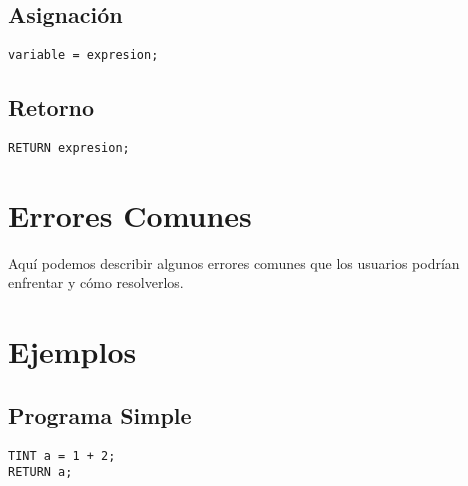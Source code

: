 \documentclass[12pt]{article}
\begin{document}
\subsection{Asignación}
\begin{lstlisting}
variable = expresion;
\end{lstlisting}

\subsection{Retorno}
\begin{lstlisting}
RETURN expresion;
\end{lstlisting}

\section{Errores Comunes}
Aquí podemos describir algunos errores comunes que los usuarios podrían enfrentar y cómo resolverlos.

\section{Ejemplos}
\subsection{Programa Simple}
\begin{lstlisting}
TINT a = 1 + 2;
RETURN a;
\end{lstlisting}
\end{document}

